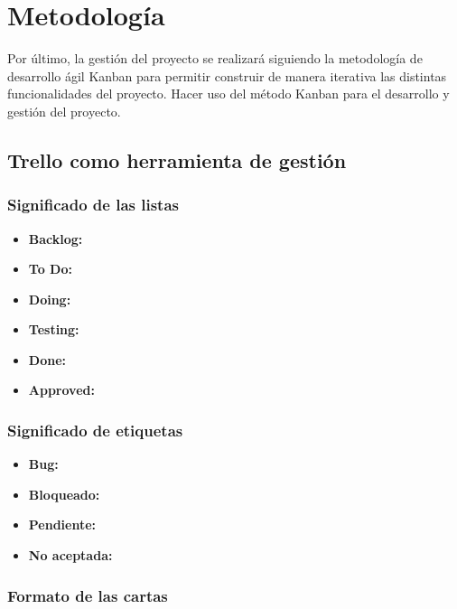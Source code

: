 \section{Metodología}\label{sec:metodologia}
Por último, la gestión del proyecto se realizará siguiendo la metodología de desarrollo ágil Kanban para permitir construir de manera iterativa las distintas funcionalidades del proyecto.
Hacer uso del método Kanban para el desarrollo y gestión del proyecto.





\subsection{Trello como herramienta de gestión}\label{subsec:trello}
\subsubsection{Significado de las listas}
\begin{itemize}
    \item \textbf{Backlog:}
    \item \textbf{To Do:}
    \item \textbf{Doing:}
    \item \textbf{Testing:}
    \item \textbf{Done:}
    \item \textbf{Approved:}
\end{itemize}

\subsubsection{Significado de etiquetas}
\begin{itemize}
    \item \textbf{Bug:}
    \item \textbf{Bloqueado:}
    \item \textbf{Pendiente:}
    \item \textbf{No aceptada:}
\end{itemize}

\subsubsection{Formato de las cartas}
